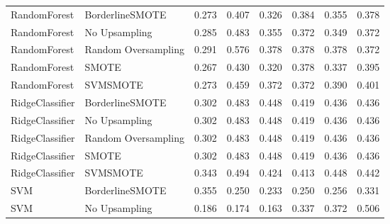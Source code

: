 \begin{tabular}{llllllll}
                RandomForest &     BorderlineSMOTE & 0.273 &                     0.407 &                 0.326 &                  0.384 &                                   0.355 &    0.378 \\
                RandomForest &       No Upsampling & 0.285 &                     0.483 &                 0.355 &                  0.372 &                                   0.349 &    0.372 \\
                RandomForest & Random Oversampling & 0.291 &                     0.576 &                 0.378 &                  0.378 &                                   0.378 &    0.372 \\
                RandomForest &               SMOTE & 0.267 &                     0.430 &                 0.320 &                  0.378 &                                   0.337 &    0.395 \\
                RandomForest &            SVMSMOTE & 0.273 &                     0.459 &                 0.372 &                  0.372 &                                   0.390 &    0.401 \\
             RidgeClassifier &     BorderlineSMOTE & 0.302 &                     0.483 &                 0.448 &                  0.419 &                                   0.436 &    0.436 \\
             RidgeClassifier &       No Upsampling & 0.302 &                     0.483 &                 0.448 &                  0.419 &                                   0.436 &    0.436 \\
             RidgeClassifier & Random Oversampling & 0.302 &                     0.483 &                 0.448 &                  0.419 &                                   0.436 &    0.436 \\
             RidgeClassifier &               SMOTE & 0.302 &                     0.483 &                 0.448 &                  0.419 &                                   0.436 &    0.436 \\
             RidgeClassifier &            SVMSMOTE & 0.343 &                     0.494 &                 0.424 &                  0.413 &                                   0.448 &    0.442 \\
                         SVM &     BorderlineSMOTE & 0.355 &                     0.250 &                 0.233 &                  0.250 &                                   0.256 &    0.331 \\
                         SVM &       No Upsampling & 0.186 &                     0.174 &                 0.163 &                  0.337 &                                   0.372 &    0.506 \\

\end{tabular}
